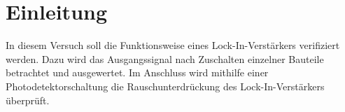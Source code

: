 
\section{Einleitung}
In diesem Versuch soll die Funktionsweise eines Lock-In-Verstärkers
verifiziert werden. Dazu wird das Ausgangssignal nach Zuschalten
einzelner Bauteile betrachtet und ausgewertet. Im Anschluss wird
mithilfe einer Photodetektorschaltung die Rauschunterdrückung des
Lock-In-Verstärkers überprüft.
